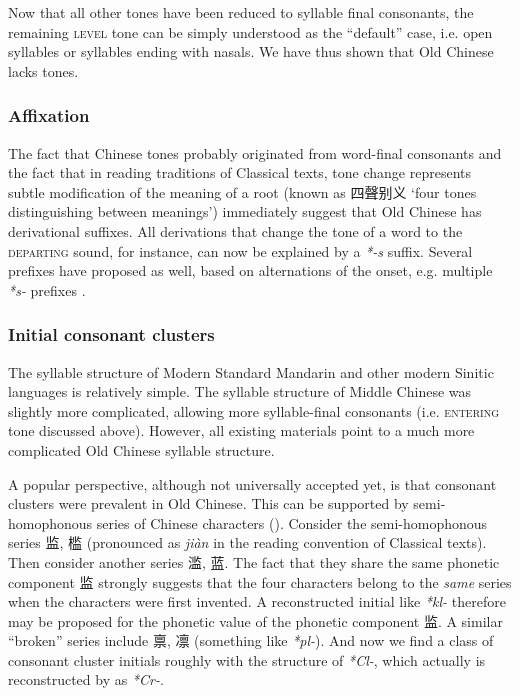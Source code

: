 \documentclass[UTF8, a4paper, oneside, scheme=plain, 12pt]{ctexrep}
\newcommand*{\citepages}[1]{pp.~{#1}}
\newcommand{\form}[1]{\emph{#1}}
\newcommand{\translate}[1]{`#1'}
\newcommand*{\category}[1]{\textsc{#1}}
\begin{document}
Now that all other tones have been reduced to syllable final consonants,
the remaining \category{level} tone can be simply understood as the ``default'' case,
i.e. open syllables or syllables ending with nasals.
We have thus shown that Old Chinese lacks tones.

\subsubsection{Affixation}
The fact that Chinese tones probably originated from word-final consonants
and the fact that in reading traditions of Classical texts,
tone change represents subtle modification of the meaning of a root
(known as 四聲别义 \translate{four tones distinguishing between meanings})
immediately suggest that Old Chinese has derivational suffixes.
All derivations that change the tone of a word to the \category{departing} sound,
for instance, can now be explained by a \form{*-s} suffix.
Several prefixes have proposed as well,
based on alternations of the onset,
e.g. multiple \form{*s-} prefixes \citep[\citepages{53-59}]{baxter2014old}.

\subsubsection{Initial consonant clusters}\label{sec:intro.prehistory.reconstruction.initial-consonant-cluster}
The syllable structure of Modern Standard Mandarin and other modern Sinitic languages is relatively simple.
The syllable structure of Middle Chinese was slightly more complicated, allowing more syllable-final consonants (i.e. \category{entering} tone discussed above).
However, all existing materials point to a much more complicated Old Chinese syllable structure.

A popular perspective, although not universally accepted yet, is that consonant clusters were prevalent in Old Chinese.
This can be supported by semi-homophonous series of Chinese characters
().
Consider the semi-homophonous series 监, 槛 (pronounced as \form{jiàn} in the reading convention of Classical texts).
Then consider another series 滥, 蓝.
The fact that they share the same phonetic component 监 strongly suggests that the four characters belong to the \emph{same} series when the characters were first invented.
A reconstructed initial like \form{*kl-} therefore may be proposed for the phonetic value of the phonetic component 监.
A similar ``broken'' series include 禀, 凛 (something like \form{*pl-}).
And now we find a class of consonant cluster initials roughly with the structure of \form{*Cl-},
which actually is reconstructed by \citet[\citepages{50-51}]{baxter2014old} as \form{*Cr-}.
\end{document}
